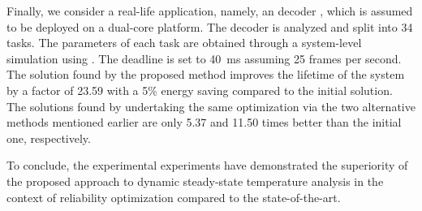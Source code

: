 Finally, we consider a real-life application, namely, an  decoder
\cite{ffmpeg2011}, which is assumed to be deployed on a dual-core platform. The
decoder is analyzed and split into 34 tasks. The parameters of each task are
obtained through a system-level simulation using  \cite{benini2005}.
The deadline is set to 40~ms assuming 25 frames per second. The solution found
by the proposed method improves the lifetime of the system by a factor of 23.59
with a 5\% energy saving compared to the initial solution. The solutions found
by undertaking the same optimization via the two alternative methods mentioned
earlier are only 5.37 and 11.50 times better than the initial one, respectively.

To conclude, the experimental experiments have demonstrated the superiority of
the proposed approach to dynamic steady-state temperature analysis in the
context of reliability optimization compared to the state-of-the-art.

